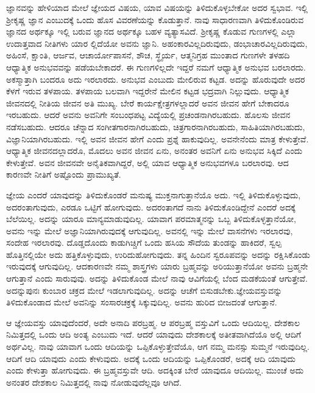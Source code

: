 \newpage

ಜ್ಞಾನವನ್ನು ಹೇಳಿಯಾದ ಮೇಲೆ ಜ್ಞೇಯದ ವಿಷಯ, ಯಾವ ವಿಷಯನ್ನು ತಿಳಿದುಕೊಳ್ಳ\-ಬೇಕೋ ಅದರ ಸ್ವಭಾವ. ಇಲ್ಲಿ ಶ‍್ರೀಕೃಷ್ಣ ಜ್ಞಾನ ಎಂಬುದಕ್ಕೆ ಒಂದು ಹೊಸ ವಿವರಣೆಯನ್ನು ಕೊಡುತ್ತಾನೆ. ನಾವು ಸಾಧಾರಣವಾಗಿ ತಿಳಿದುಕೊಂಡಿರುವ ಜ್ಞಾನದ ಅರ್ಥಕ್ಕೂ ಇಲ್ಲಿ ಬರುವ ಜ್ಞಾನದ ಅರ್ಥಕ್ಕೂ ಬಹಳ ವ್ಯತ್ಯಾಸವಿದೆ. ಶ‍್ರೀಕೃಷ್ಣ ಕೊಡುವ ಗುಣಗಳಲ್ಲಿ ಎಲ್ಲಾ ಉದಾತ್ತವಾದ ನೀತಿಗಳು ಯಾರ ಲ್ಲಿದೆಯೋ ಅವನು ಜ್ಞಾನಿ. ಅಹಂಕಾರವಿಲ್ಲದಿರುವುದು, ಡಂಭಾಚಾರವಿಲ್ಲದಿರುವುದು, ಅಹಿಂಸೆ, ಕ್ಷಾಂತಿ, ಆರ್ಜವ, ಆಚಾರ್ಯೋಪಾಸನೆ, ಶೌಚ, ಸ್ಥೈರ್ಯ, ಆತ್ಮನಿಗ್ರಹ ಮುಂತಾದ ಗುಣಗಳೇ ತಳಹದಿ ಆಧ್ಯಾತ್ಮಿಕ ಅನುಭವವನ್ನು ಪಡೆಯಬೇಕಾದರೆ. ಈ ಗುಣ\-ಗಳಿಲ್ಲದೇ ಇದ್ದರೆ ನಮಗೆ ಆಧ್ಯಾತ್ಮಿಕ ಅನುಭವ ಬರಲಾರದು. ಅಕಸ್ಮಾತ್ತಾಗಿ ಬಂದರೂ ಅದು ಇರಲಾರದು. ಅನುಭವ ಎಂಬುದು ಮೇಲಿರುವ ಕಟ್ಟಡ. ಅದನ್ನು ಹೊರುವುದೇ ಅದರ ಕೆಳಗೆ ಇರುವ ತಳಪಾಯ. ತಳಪಾಯ ಬಲವಾಗಿ ಇದ್ದರೇನೆ ಮೇಲಿನ ಕಟ್ಟಡ ಭದ್ರವಾಗಿ ನಿಲ್ಲುವುದು. ಆಧ್ಯಾತ್ಮಿಕ ಜೀವನದಲ್ಲಿ ನೀತಿಯ ಜೀವನ ಅತಿ ಮುಖ್ಯ. ಬೇರೆ ಕಾರ್ಯಕ್ಷೇತ್ರಗಳಲ್ಲಾದರೆ ಅವನ ಜೀವನ ಹೇಗೆ ಬೇಕಾದರೂ ಇರಬಹುದು. ಆದರೆ ಅವನು ಅವನಿಗೇ ಸಂಬಂಧಪಟ್ಟ ವಿದ್ಯೆಯಲ್ಲಿ ಪ್ರಚಂಡನಾಗಿರಬಹುದು. ಹೊಲಸು ಜೀವನ ನಡೆಸಬಹುದು. ಆದರೂ ಚೆನ್ನಾದ ಸಂಗೀತಗಾರನಾಗಿರಬಹುದು, ಚಿತ್ರಗಾರನಾಗಿರಬಹುದು, ಸಾಹಿತಿಯಾಗಿರಬಹುದು, ವಿಜ್ಞಾನಿ\-ಯಾಗಿರಬಹುದು. ಇಲ್ಲಿ ಅವನ ಜೀವನ ಹೇಗೆ ಎಂದು ಪ್ರಶ್ನೆ ಹಾಕುವುದಿಲ್ಲ. ಅವನೇನೆಂದು ಮಾತ್ರ ಕೇಳುತ್ತೇವೆ. ಆಧ್ಯಾತ್ಮಿಕ ಜೀವನದಲ್ಲಾದರೊ, ಮೊದಲು ಅವನ ಜೀವನ ಏನು, ಅನಂತರ ಅವನಿಗೆ ಏನು ಅನುಭವ ಸಿಕ್ಕಿದೆ ಎಂದು ಕೇಳುತ್ತೇವೆ. ಅವನ ಜೀವನವೇ ಅನೈತಿಕವಾಗಿದ್ದರೆ, ಅಲ್ಲಿ ಯಾವ ಆಧ್ಯಾತ್ಮಿಕ ಅನುಭವಗಳೂ ಬರಲಾರವು. ಆದ ಕಾರಣವೇ ನೀತಿಗೆ ಅಷ್ಟೊಂದು ಪ್ರಾಮುಖ್ಯತೆ.

ಜ್ಞೇಯ ಎಂದರೆ ಯಾವುದನ್ನು ತಿಳಿದುಕೊಂಡರೆ ಮನುಷ್ಯ ಮುಕ್ತನಾಗುತ್ತಾನೆಯೊ ಅದು. ಇಲ್ಲಿ ತಿಳಿದುಕೊಳ್ಳುವುದು, ಅದರಂತಾಗುವುದು, ಎರಡೂ ಒಟ್ಟಿಗೆ ಹೋಗುವುದು. ಅದರಂತಾಗದೆ ನಾನು ತಿಳಿದುಕೊಂಡಿದ್ದೇನೆ ಎಂದರೆ ಅದಕ್ಕೆ ಬೆಲೆಯಿಲ್ಲ. ಅದನ್ನು ಯಾರೂ ಮಾನ್ಯಮಾಡುವುದಿಲ್ಲ. ಯಾವಾಗ ಪರಮಾತ್ಮನನ್ನು ಒಬ್ಬ ತಿಳಿದುಕೊಳ್ಳತ್ತಾನೆಯೋ, ಅವನು ಇನ್ನು ಮೇಲೆ ಅಜ್ಞಾನಿಯಾಗಿರುವುದಕ್ಕೆ ಆಗುವುದಿಲ್ಲ. ಅವನಲ್ಲಿ ಇನ್ನು ಮೇಲೆ ವಾಸನೆಗಳು ಇರಲಾರವು, ಸಂದೇಹ ಇರಲಾರವು. ದೊಡ್ಡದೊಂದು ಕಾಡುಗಿಚ್ಚಿಗೆ ಒಂದು ಹಸಿಯ ಸೌದೆಯ ತುಂಡನ್ನು ಹಾಕಿದರೆ, ಸ್ವಲ್ಪ ಹೊತ್ತಿನಲ್ಲಿಯೇ ಅದು ಹತ್ತಿಕೊಳ್ಳುವುದು, ಉರಿದುಹೋಗುವುದು. ತನ್ನ ಹಿಂದಿನ ಸ್ವರೂಪವನ್ನು ಅದನ್ನು ರಕ್ಷಿಸಿಕೊಂಡು ಇರುವುದಕ್ಕೆ ಆಗುವುದಿಲ್ಲ. ಆದಕಾರಣವೇ ನಮ್ಮ ಶಾಸ್ತ್ರಗಳು ಯಾರು ಬ್ರಹ್ಮವನ್ನು ಅರಿಯುತ್ತಾನೆಯೋ ಅವನು ಬ್ರಹ್ಮನೇ ಆಗುತ್ತಾನೆ ಎಂದು ಸಾರುವುವು. ಅದನ್ನು ತಿಳಿದುಕೊಂಡ ಮೇಲೆ ನಾವು ಆವಿಗೆಯಲ್ಲಿ ಬೆಂದ ಮಡಕೆಯಂತೆ ಆಗುತ್ತೇವೆ. ಅದನ್ನು\break ಪುನಃ ಕುಂಬಾರ ಚಕ್ರದ ಮೇಲೆ ಇಡಲಾಗುವುದಿಲ್ಲ. ಅದನ್ನು ಆಚೆಗೆ ಬಿಸುಡಬೇಕು.\break ಜ್ಞೇಯವಸ್ತುವನ್ನು ತಿಳಿದುಕೊಂಡಾದ ಮೇಲೆ ಅವನಿನ್ನು ಸಂಸಾರಚಕ್ರಕ್ಕೆ ಸಿಕ್ಕುವುದಿಲ್ಲ. ಅವನು ಹುರಿದ ಬೀಜದಂತೆ ಆಗುತ್ತಾನೆ.

ಆ ಜ್ಞೇಯವಸ್ತು ಯಾವುದೆಂದರೆ, ಅದೇ ಅನಾದಿ ಪರಬ್ರಹ್ಮ. ಆ ಪರಬ್ರಹ್ಮ ವಸ್ತುವಿಗೆ ಒಂದು ಆದಿಯಿಲ್ಲ. ದೇಶಕಾಲ ನಿಮಿತ್ತದಲ್ಲಿ ಒಂದು ಆದಿ ಅಂತ್ಯ ಎಂಬುದು ಇದೆ. ಆದರೆ ಯಾವುದು ದೇಶಕಾಲಕ್ಕೆ ಅತೀತವಾಗಿದೆಯೊ ಅಲ್ಲಿ ಆದಿಗೆ ಅರ್ಥವಿಲ್ಲ. ನಾವು ಯಾವಾಗ ಒಂದು ಆದಿಯನ್ನು ಒಪ್ಪಿಕೊಳ್ಳುತ್ತೇವೆಯೊ, ಆಗ ನಮ್ಮ ಮನಸ್ಸು ಸುಮ್ಮನೆ ಇರುವುದಿಲ್ಲ. ಆದಿಗೆ ಆದಿ ಯಾವುದು ಎಂದು ಕೇಳುವುದು. ಅದಕ್ಕೆ ಒಂದು ಆದಿಯನ್ನು ಒಪ್ಪಿಕೊಂಡರೆ, ಅದಕ್ಕೆ ಆದಿ ಯಾವುದು ಎಂದು ಕೇಳುತ್ತಾ ಹೋಗುವುದು. ಈ ಬ್ರಹ್ಮವಸ್ತುವೇ ಆದಿ. ಅದಕ್ಕಿಂತ ಬೇರೆ ಯಾವುದೂ ಆದಿಯಿಲ್ಲ. ಮುಂಚೆ ಅದು ಅನಂತರ ದೇಶಕಾಲ ನಿಮಿತ್ತದಲ್ಲಿ ನಾವು ನೋಡುವುದೆಲ್ಲವೂ ಆಗಿದೆ.

